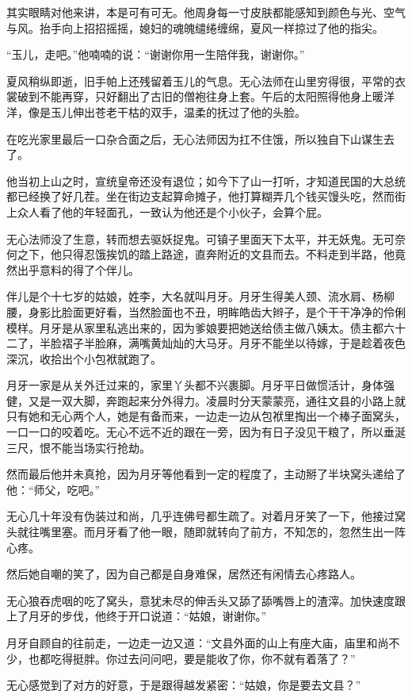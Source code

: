 其实眼睛对他来讲，本是可有可无。他周身每一寸皮肤都能感知到颜色与光、空气与风。抬手向上招招摇摇，媳妇的魂魄缱绻缠绵，夏风一样掠过了他的指尖。

``玉儿，走吧。''他喃喃的说：``谢谢你用一生陪伴我，谢谢你。''

夏风稍纵即逝，旧手帕上还残留着玉儿的气息。无心法师在山里穷得很，平常的衣裳破到不能再穿，只好翻出了古旧的僧袍往身上套。午后的太阳照得他身上暖洋洋，像是玉儿伸出苍老干枯的双手，温柔的抚过了他的头脸。

在吃光家里最后一口杂合面之后，无心法师因为扛不住饿，所以独自下山谋生去了。

他当初上山之时，宣统皇帝还没有退位；如今下了山一打听，才知道民国的大总统都已经换了好几茬。坐在街边支起算命摊子，他打算糊弄几个钱买馒头吃，然而街上众人看了他的年轻面孔，一致认为他还是个小伙子，会算个屁。

无心法师没了生意，转而想去驱妖捉鬼。可镇子里面天下太平，并无妖鬼。无可奈何之下，他只得忍饿挨饥的踏上路途，直奔附近的文县而去。不料走到半路，他竟然出乎意料的得了个伴儿。

伴儿是个十七岁的姑娘，姓李，大名就叫月牙。月牙生得美人颈、流水肩、杨柳腰，身影比脸面更好看，当然脸面也不丑，明眸皓齿大辫子，是个干干净净的伶俐模样。月牙是从家里私逃出来的，因为爹娘要把她送给债主做八姨太。债主都六十二了，半脸褶子半脸麻，满嘴黄灿灿的大马牙。月牙不能坐以待嫁，于是趁着夜色深沉，收拾出个小包袱就跑了。

月牙一家是从关外迁过来的，家里丫头都不兴裹脚。月牙平日做惯活计，身体强健，又是一双大脚，奔跑起来分外得力。凌晨时分天蒙蒙亮，通往文县的小路上就只有她和无心两个人，她是有备而来，一边走一边从包袱里掏出一个棒子面窝头，一口一口的咬着吃。无心不远不近的跟在一旁，因为有日子没见干粮了，所以垂涎三尺，恨不能当场实行抢劫。

然而最后他并未真抢，因为月牙等他看到一定的程度了，主动掰了半块窝头递给了他：``师父，吃吧。''

无心几十年没有伪装过和尚，几乎连佛号都生疏了。对着月牙笑了一下，他接过窝头就往嘴里塞。而月牙看了他一眼，随即就转向了前方，不知怎的，忽然生出一阵心疼。

然后她自嘲的笑了，因为自己都是自身难保，居然还有闲情去心疼路人。

无心狼吞虎咽的吃了窝头，意犹未尽的伸舌头又舔了舔嘴唇上的渣滓。加快速度跟上了月牙的步伐，他终于开口说道：``姑娘，谢谢你。''

月牙自顾自的往前走，一边走一边又道：``文县外面的山上有座大庙，庙里和尚不少，也都吃得挺胖。你过去问问吧，要是能收了你，你不就有着落了？''

无心感觉到了对方的好意，于是跟得越发紧密：``姑娘，你是要去文县？''

